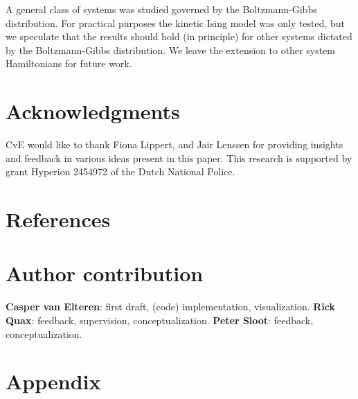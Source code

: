 \documentclass[a4paper, 11pt, twocolumn]{article}
\begin{document}
A  general class  of  systems was  studied  governed by  the
Boltzmann-Gibbs  distribution.  For practical  purposes  the
kinetic Ising model  was only tested, but  we speculate that
the  results should  hold (in  principle) for  other systems
dictated by  the Boltzmann-Gibbs distribution. We  leave the
extension to other system Hamiltonians for future work.

\section{Acknowledgments}
\label{sec:orgf30530a}
CvE would like to thank  Fiona Lippert, and Jair Lenssen for
providing insights and feedback  in various ideas present in
this  paper. This  research is  supported by  grant Hyperion
2454972 of the Dutch National Police.

\section{References}
\label{sec:org26fe258}
\printbibliography[heading=none]
\section{Author contribution}
\label{sec:org02468eb}
\textbf{Casper  van Elteren}:  first  draft, (code)  implementation,
 visualization.    \textbf{Rick   Quax}:   feedback,   supervision,
 conceptualization. \textbf{Peter Sloot}:    feedback,
 conceptualization.



\newpage
\appendix
\section{Appendix}
\label{sec:org854db8e}
\end{document}
